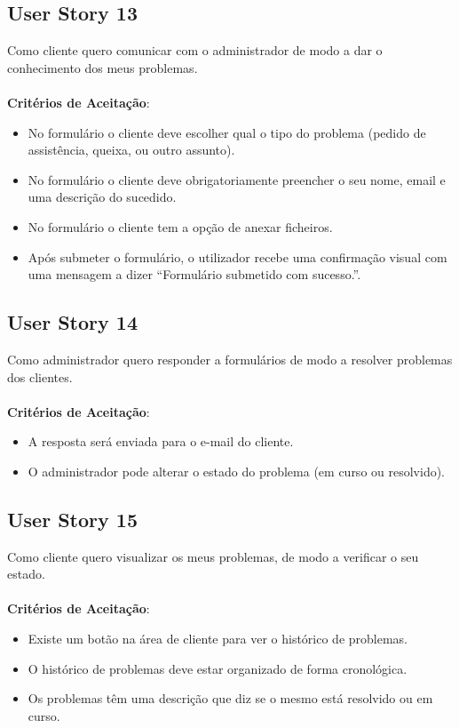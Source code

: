 \documentclass[a4paper,11pt]{article}
\begin{document}
\subsection{User Story 13}
Como cliente quero comunicar com o administrador de modo a dar o conhecimento dos meus problemas.\\\\
\textbf{Critérios de Aceitação}:
\begin{itemize}
  \item No formulário o cliente deve escolher qual o tipo do problema (pedido de assistência, queixa, ou outro assunto).
  \item No formulário o cliente deve obrigatoriamente preencher o seu nome, email e uma descrição do sucedido.
  \item No formulário o cliente tem a opção de anexar ficheiros.
  \item Após submeter o formulário, o utilizador recebe uma confirmação visual com uma mensagem a dizer “Formulário submetido com sucesso.”.
\end{itemize}
\subsection{User Story 14}
Como administrador quero responder a formulários de modo a resolver problemas dos clientes.\\\\
\textbf{Critérios de Aceitação}:
\begin{itemize}
  \item A resposta será enviada para o e-mail do cliente.
  \item O administrador pode alterar o estado do problema (em curso ou resolvido).
\end{itemize}
\subsection{User Story 15}
Como cliente quero visualizar os meus problemas, de modo a verificar o seu estado.\\\\
\textbf{Critérios de Aceitação}:
\begin{itemize}
  \item Existe um botão na área de cliente para ver o histórico de problemas.
  \item O histórico de problemas deve estar organizado de forma cronológica.
  \item Os problemas têm uma descrição que diz se o mesmo está resolvido ou em curso.
\end{itemize}
\end{document}
